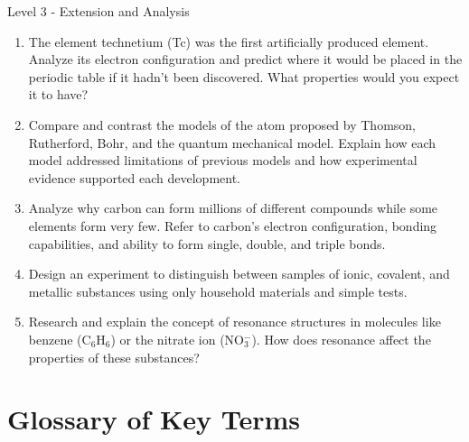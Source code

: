 \begin{tieredquestions}{Level 3 - Extension and Analysis}
\begin{enumerate}
    \item The element technetium (Tc) was the first artificially produced element. Analyze its electron configuration and predict where it would be placed in the periodic table if it hadn't been discovered. What properties would you expect it to have?
    
    \item Compare and contrast the models of the atom proposed by Thomson, Rutherford, Bohr, and the quantum mechanical model. Explain how each model addressed limitations of previous models and how experimental evidence supported each development.
    
    \item Analyze why carbon can form millions of different compounds while some elements form very few. Refer to carbon's electron configuration, bonding capabilities, and ability to form single, double, and triple bonds.
    
    \item Design an experiment to distinguish between samples of ionic, covalent, and metallic substances using only household materials and simple tests.
    
    \item Research and explain the concept of resonance structures in molecules like benzene (C$_6$H$_6$) or the nitrate ion (NO$_3^-$). How does resonance affect the properties of these substances?
\end{enumerate}
\end{tieredquestions}

\section{Glossary of Key Terms}

